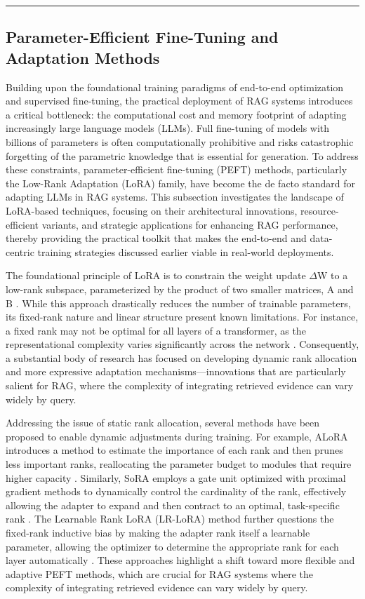 \documentclass[11pt]{article}
\begin{document}
\begin{center}\rule{0.5\linewidth}{0.5pt}\end{center}

\subsection{Parameter-Efficient Fine-Tuning and Adaptation Methods}

Building upon the foundational training paradigms of end-to-end optimization and supervised fine-tuning, the practical deployment of RAG systems introduces a critical bottleneck: the computational cost and memory footprint of adapting increasingly large language models (LLMs). Full fine-tuning of models with billions of parameters is often computationally prohibitive and risks catastrophic forgetting of the parametric knowledge that is essential for generation. To address these constraints, parameter-efficient fine-tuning (PEFT) methods, particularly the Low-Rank Adaptation (LoRA) family, have become the de facto standard for adapting LLMs in RAG systems. This subsection investigates the landscape of LoRA-based techniques, focusing on their architectural innovations, resource-efficient variants, and strategic applications for enhancing RAG performance, thereby providing the practical toolkit that makes the end-to-end and data-centric training strategies discussed earlier viable in real-world deployments.

The foundational principle of LoRA is to constrain the weight update \(\Delta\)W to a low-rank subspace, parameterized by the product of two smaller matrices, A and B \cite{ref229}. While this approach drastically reduces the number of trainable parameters, its fixed-rank nature and linear structure present known limitations. For instance, a fixed rank may not be optimal for all layers of a transformer, as the representational complexity varies significantly across the network \cite{ref230}. Consequently, a substantial body of research has focused on developing dynamic rank allocation and more expressive adaptation mechanisms---innovations that are particularly salient for RAG, where the complexity of integrating retrieved evidence can vary widely by query.

Addressing the issue of static rank allocation, several methods have been proposed to enable dynamic adjustments during training. For example, ALoRA introduces a method to estimate the importance of each rank and then prunes less important ranks, reallocating the parameter budget to modules that require higher capacity \cite{ref231}. Similarly, SoRA employs a gate unit optimized with proximal gradient methods to dynamically control the cardinality of the rank, effectively allowing the adapter to expand and then contract to an optimal, task-specific rank \cite{ref232}. The Learnable Rank LoRA (LR-LoRA) method further questions the fixed-rank inductive bias by making the adapter rank itself a learnable parameter, allowing the optimizer to determine the appropriate rank for each layer automatically \cite{ref230}. These approaches highlight a shift toward more flexible and adaptive PEFT methods, which are crucial for RAG systems where the complexity of integrating retrieved evidence can vary widely by query.
\end{document}
